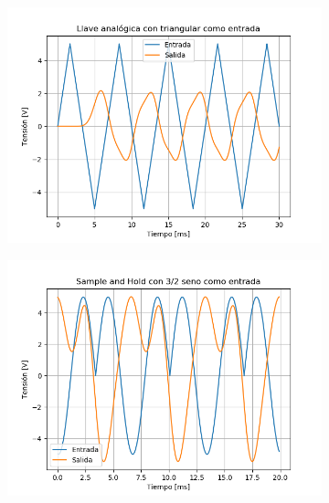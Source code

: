 \begin{figure}[H]
	\begin{subfigure}{.5\textwidth}
	\centering
	\includegraphics[width=\textwidth]{ImagenesEjercicio6/LA - Tri.png}
	\end{subfigure}
	\begin{subfigure}{.5\textwidth}
	\centering
	\includegraphics[width=\textwidth]{ImagenesEjercicio6/SH - 3 2.png}
	\end{subfigure}
	

\end{figure}
